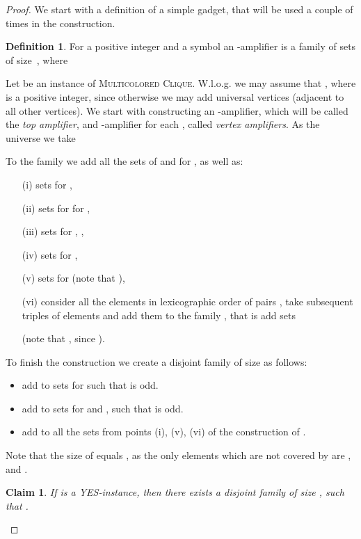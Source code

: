 \documentclass[11pt]{article}
\newtheorem{claim}[theorem]{Claim}
\theoremstyle{definition}
\newtheorem{definition}[theorem]{Definition}
\newcommand{\MC}{{\textsc{Multicolored Clique}}\xspace}
\begin{document}
\begin{proof}
We start with a definition of a simple gadget, that will be used a couple of times
in the construction.
\begin{definition}
For a positive integer  and a symbol  an -amplifier is a family  of sets of size~, where 

\end{definition}

Let  be an instance of \MC.
W.l.o.g. we may assume that , where  is a positive integer,
since otherwise we may add universal vertices (adjacent to all other vertices).
We start with constructing an -amplifier, which will
be called the {\em top amplifier},
and -amplifier for each , called {\em vertex amplifiers}.
As the universe  we take

To the family  we add all the sets of  and  for , as well as:
\begin{itemize}
  \item[(i)] sets  for ,
  \item[(ii)] sets  for  for ,
  \item[(iii)] sets  for , ,
  \item[(iv)] sets  for ,
  \item[(v)] sets  for  (note that ),
  \item[(vi)] consider all the elements  in lexicographic order of pairs ,
  take subsequent triples of elements and add them to the family , that is
  add sets 
  
  (note that , since ).
\end{itemize}

To finish the construction we create a disjoint family  of size  as follows:
\begin{itemize}
  \item add to  sets  for  such that  is odd.
  \item add to  sets  for  and , such that  is odd.
  \item add to  all the sets from points (i), (v), (vi) of the construction of .
\end{itemize}

Note that the size of  equals , as the only elements which are not covered by  are ,  and .

\begin{claim}
\label{claim:1}
If  is a YES-instance, then there exists a disjoint family  of size ,
such that .
\end{claim}


\end{proof}
\end{document}
